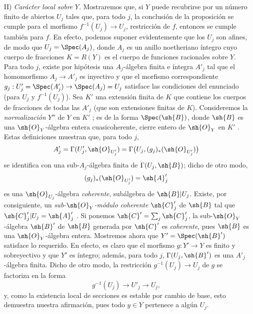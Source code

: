 II) \emph{Carácter local sobre $Y$.}
Mostraremos que, si $Y$ puede recubrirse por un número finito de abiertos $U_j$ tales que, para todo $j$, la conclusión de la proposición se cumple para el morfismo $f^{-1}(U_j)\to U_j$, restricción de $f$, entonces se cumple también para $f$.
En efecto, podemos suponer evidentemente que los $U_j$ son afines, de modo que $U_j=\Spec(A_j)$, donde $A_j$ es un anillo noetheriano íntegro cuyo cuerpo de fracciones $K=R(Y)$ es el cuerpo de funciones racionales sobre $Y$.
Para todo $j$, existe por hipótesis una $A_j$-álgebra finita e íntegra $A'_j$ tal que el homomorfismo $A_j\to A'_j$ es inyectivo  y que el morfismo correspondiente $g_j:U'_j=\Spec(A'_j)\to\Spec(A_j)=U_j$ satisface las condiciones del enunciado (para $U_j$ y $f^{-1}(U_j)$).
Sea $K'$ una extensión finita de $K$ que contiene los cuerpos de fracciones de todas las $A'_j$ (que son extensiones finitas de $K$).
Consideremos la \emph{normalización} $Y''$ de $Y$ en $K'$ ; es de la forma $\Spec(\sh{B})$, donde $\sh{B}$ es una $\sh{O}_Y$-álgebra entera cuasicoherente, cierre entero de $\sh{O}_Y$ en $K'$ .
Estas definiciones muestran que, para todo $j$,
\[
 A'_j=\Gamma(U'_j,\sh{O}_{U'_j})
     =\Gamma\bigl(U_j,(g_j)_*(\sh{O}_{U'_j})\bigr)
\]
se identifica con una sub-$A_j$-álgebra finita de $\Gamma(U_j,\sh{B})$; dicho de otro modo,
\[
 (g_j)_*(\sh{O}_{U'_j})=\sh{A}'_j
\]
es una $\sh{O}_{U_j}$-álgebra \emph{coherente}, subálgebra de $\sh{B}|U_j$.
Existe, por consiguiente, un \emph{sub-$\sh{O}_Y$-módulo coherente $\sh{C}'_j$} de $\sh{B}$ tal que $\sh{C}'_j|U_j=\sh{A}'_j$ .
Si ponemos $\sh{C}'=\sum_j\sh{C}'_j$, la sub-$\sh{O}_Y$-álgebra $\sh{B}'$ de $\sh{B}$ generada por $\sh{C}'$ es \emph{coherente}, pues $\sh{B}$ es una $\sh{O}_Y$-álgebra entera.
Mostremos ahora que $Y'=\Spec(\sh{B}')$ satisface lo requerido.
En efecto, es claro que el morfismo $g:Y'\to Y$ es finito y sobreyectivo y que $Y'$ es íntegro; además, para todo $j$, $\Gamma(U_j,\sh{B}')$ es una $A'_j$-álgebra finita.
Dicho de otro modo, la restricción $g^{-1}(U_j)\to U_j$ de $g$ se factoriza en la forma
\[
 g^{-1}(U_j)\longrightarrow U'_j\longrightarrow U_j,
\]
y, como la existencia local de secciones es estable por cambio de base, esto demuestra nuestra afirmación, pues todo $y\in Y$ pertenece a algún $U_j$.

